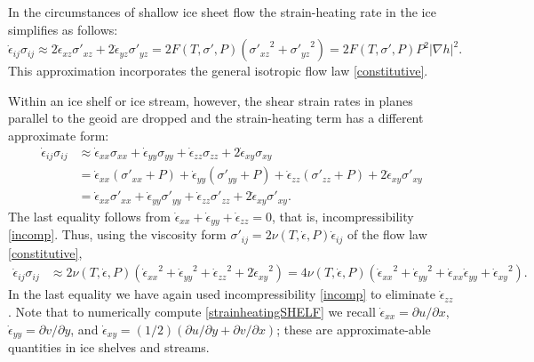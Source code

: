 \documentclass[12pt,final]{amsart}%
\theoremstyle{plain}
\theoremstyle{definition}
\theoremstyle{remark}
\def\eps{\epsilon}
\newcommand{\grad}{\nabla}
\begin{document}
In the circumstances of shallow ice sheet flow \citep{Fowler} the strain-heating rate in the ice simplifies as follows:
\begin{equation}\label{strainheatingSIA}
\dot\eps_{ij}\sigma_{ij} \approx 2\dot\eps_{xz}\sigma'_{xz} + 2\dot\eps_{yz}\sigma'_{yz} = 2 F(T,\sigma',P) \left({\sigma'_{xz}}^2 + {\sigma'_{yz}}^2\right) = 2 F(T,\sigma',P) P^2 |\grad h|^2.
\end{equation}
This approximation incorporates the general isotropic flow law \eqref{constitutive}.

Within an ice shelf or ice stream, however, the shear strain rates in planes parallel to the geoid are dropped and the strain-heating term has a different approximate form:
\begin{align*}
\dot\eps_{ij}\sigma_{ij} &\approx \dot\eps_{xx}\sigma_{xx} + \dot\eps_{yy}\sigma_{yy} + \dot\eps_{zz}\sigma_{zz} + 2 \dot\eps_{xy}\sigma_{xy} \\
    &= \dot\eps_{xx}(\sigma'_{xx} + P) + \dot\eps_{yy}(\sigma'_{yy} + P) + \dot\eps_{zz}(\sigma'_{zz} + P) + 2 \dot\eps_{xy}\sigma'_{xy} \\
    &= \dot\eps_{xx}\sigma'_{xx} + \dot\eps_{yy}\sigma'_{yy} + \dot\eps_{zz}\sigma'_{zz}  + 2 \dot\eps_{xy}\sigma'_{xy}.
\end{align*}
The last equality follows from $\dot\eps_{xx} + \dot\eps_{yy} + \dot\eps_{zz} = 0$, that is, incompressibility \eqref{incomp}.  Thus, using the viscosity form $\sigma'_{ij} = 2 \nu(T,\dot\eps,P) \dot\eps_{ij}$ of the flow law \eqref{constitutive},
\begin{align}
\dot\eps_{ij}\sigma_{ij} &\approx 2 \nu(T,\dot\eps,P) \left({\dot\eps_{xx}}^2 + {\dot\eps_{yy}}^2 + {\dot\eps_{zz}}^2  + 2{\dot\eps_{xy}}^2\right) = 4 \nu(T,\dot\eps,P) \left({\dot\eps_{xx}}^2 + {\dot\eps_{yy}}^2 + \dot\eps_{xx} \dot\eps_{yy} + {\dot\eps_{xy}}^2\right). \label{strainheatingSHELF}
\end{align}
In the last equality we have again used incompressibility \eqref{incomp} to eliminate $\dot\eps_{zz}$.  Note that to numerically compute \eqref{strainheatingSHELF} we recall $\dot\eps_{xx} = \partial u/\partial x$, $\dot\eps_{yy} = \partial v/\partial y$, and $\dot\eps_{xy} = (1/2)\left(\partial u/\partial y + \partial v/\partial x\right)$; these are approximate-able quantities in ice shelves and streams.
\end{document}
